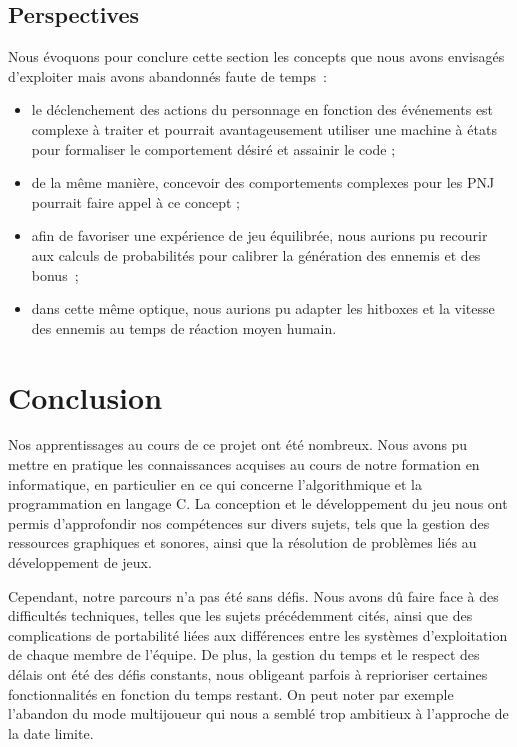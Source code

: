 \documentclass[a4paper,12pt]{article}
\begin{document}
\subsection{Perspectives}

Nous évoquons pour conclure cette section les concepts que nous avons envisagés d’exploiter mais avons abandonnés faute de temps :
\begin{itemize}
    \item le déclenchement des actions du personnage en fonction des événements est complexe à traiter et pourrait avantageusement utiliser une machine à états pour formaliser le comportement désiré et assainir le code ;
    \item de la même manière, concevoir des comportements complexes pour les PNJ pourrait faire appel à ce concept ;
    \item afin de favoriser une expérience de jeu équilibrée, nous aurions pu recourir aux calculs de probabilités pour calibrer la génération des ennemis et des bonus ;
    \item dans cette même optique, nous aurions pu adapter les hitboxes et la vitesse des ennemis au temps de réaction moyen humain.
\end{itemize}

\section{Conclusion}

Nos apprentissages au cours de ce projet ont été nombreux. Nous avons pu mettre en pratique les connaissances acquises au cours de notre formation en informatique, en particulier en ce qui concerne l’algorithmique et la programmation en langage C. 
La conception et le développement du jeu nous ont permis d’approfondir nos compétences sur divers sujets, tels que la gestion des ressources graphiques et sonores, ainsi que la résolution de problèmes liés au développement de jeux.

Cependant, notre parcours n’a pas été sans défis. Nous avons dû faire face à des diﬀicultés techniques, telles que les sujets précédemment cités, ainsi que des complications de portabilité liées aux différences entre les systèmes d’exploitation de chaque membre de l’équipe. De plus, la gestion du temps et le respect des délais ont été des défis constants, nous obligeant parfois à reprioriser certaines fonctionnalités en fonction du temps restant. 
On peut noter par exemple l’abandon du mode multijoueur qui nous a semblé trop ambitieux à l’approche de la date limite. 
\end{document}
